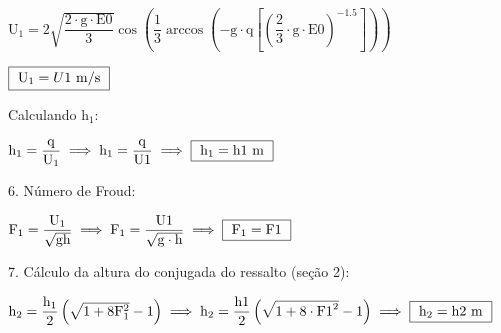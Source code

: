 \documentclass{article}
\newcommand{\myspace}{0.5cm}
\begin{document}
\begin{center}
	$
		\mathrm
		{
			U_{1}=2\sqrt{\dfrac{2 \cdot {{g}} \cdot {{E0}} }{3}}\cos \! \left (\dfrac{1}{3}\arccos \! \left( - {{g}} \cdot {{q}} \left [\left ( \dfrac{2}{3}\cdot {{g}} \cdot {{E0}} \right )^{-1.5}  \right] \right ) \right)
		}
	$
\end{center}

\vspace{\myspace}

\begin{center}
	$
		\fbox
		{
			$
				\mathrm{U_{1}}= {{U1}} \mathrm{\ m/s}
			$
		}
	$
\end{center}

\vspace{\myspace}

Calculando $ \mathrm{h_{1}}$:

\vspace{\myspace}

\begin{center}
	$
		\mathrm
		{
			h_{1}= \dfrac{q}{U_{1}}
		} 
		\implies
		\mathrm
		{
			h_{1}= \dfrac{ {{q}} }{ {{U1}} }
		}
		\implies
		\fbox{ 
			$
				\mathrm
				{
					h_{1}= {{h1}} \ m
				}
			$  
		}
	$
\end{center}

\vspace{\myspace}

6. Número de Froud:	

\vspace{\myspace}

\begin{center}
	$
		\mathrm
		{
			F_{1} = \dfrac{U_{1}}{\sqrt{gh}}
		}
		\implies
		\mathrm
		{
			F_{1} = \dfrac{ {{U1}} }{\sqrt{ {{g}} \cdot {{h}} }}
		}
		\implies 
		\fbox
		{
			$\mathrm
			{
				F_{1} = {{F1}} 
			}$
		}
	$  
\end{center}

\vspace{\myspace}

7. Cálculo da altura do conjugada do ressalto (seção 2):

\vspace{\myspace}

\begin{center}
	$
		\mathrm
		{
			h_{2} = \dfrac{h_{1}}{2}\left ( \sqrt{1+ 8F_{1}^{2}} - 1\right )
		}
		\implies 
		\mathrm
		{
			h_{2} = \dfrac{ {{h1}} }{2}\left ( \sqrt{1+ 8\cdot {{F1}} ^{2}} - 1\right )
		}
		\implies 
		\fbox
		{
			$\mathrm
			{
				h_{2} = {{h2}} \ m
			}$
		}
	$
\end{center}
\end{document}
